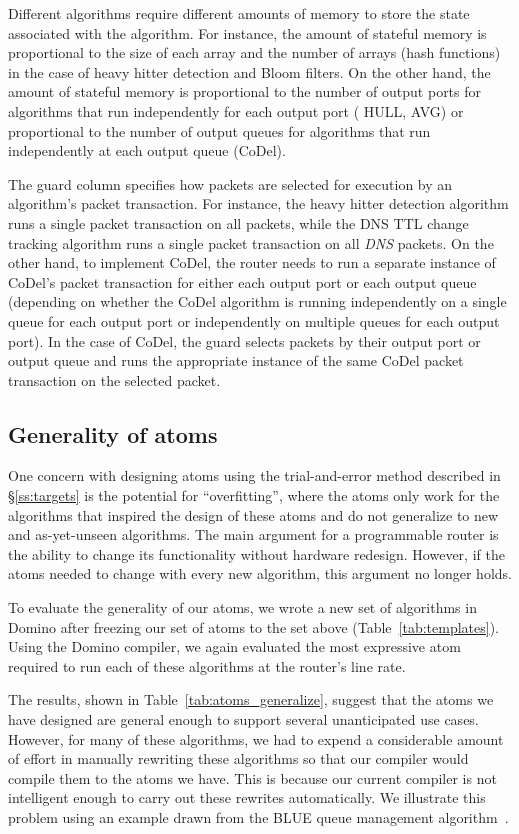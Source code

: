 Different algorithms require different amounts of memory to store the state
associated with the algorithm. For instance, the amount of stateful memory is
proportional to the size of each array and the number of arrays (hash
functions) in the case of heavy hitter detection and Bloom filters. On the
other hand, the amount of stateful memory is proportional to the number of
output ports for algorithms that run independently for each output port (\eg
HULL, AVG) or proportional to the number of output queues for algorithms that
run independently at each output queue (\eg CoDel).

The guard column specifies how packets are selected for execution by an
algorithm's packet transaction. For instance, the heavy hitter detection
algorithm runs a single packet transaction on all packets, while the DNS TTL
change tracking algorithm runs a single packet transaction on all {\em DNS}
packets. On the other hand, to implement CoDel, the router needs to run a
separate instance of CoDel's packet transaction for either each output port or
each output queue (depending on whether the CoDel algorithm is running
independently on a single queue for each output port or independently on
multiple queues for each output port). In the case of CoDel, the guard selects
packets by their output port or output queue and runs the appropriate instance
of the same CoDel packet transaction on the selected packet.

\subsection{Generality of atoms}

One concern with designing atoms using the trial-and-error method described in
\S\ref{ss:targets} is the potential for ``overfitting'', where the atoms only
work for the algorithms that inspired the design of these atoms and do not
generalize to new and as-yet-unseen algorithms. The main argument for a
programmable router is the ability to change its functionality without hardware
redesign. However, if the atoms needed to change with every new algorithm, this
argument no longer holds.

To evaluate the generality of our atoms, we wrote a new set of algorithms in
Domino after freezing our set of atoms to the set above
(Table~\ref{tab:templates}). Using the Domino compiler, we again evaluated the
most expressive atom required to run each of these algorithms at the router's
line rate.


The results, shown in Table~\ref{tab:atoms_generalize}, suggest that the atoms
we have designed are general enough to support several unanticipated use cases.
However, for many of these algorithms, we had to expend a considerable amount
of effort in manually rewriting these algorithms so that our compiler would
compile them to the atoms we have. This is because our current compiler is not
intelligent enough to carry out these rewrites automatically. We illustrate
this problem using an example drawn from the BLUE queue management
algorithm~\cite{blue}.

